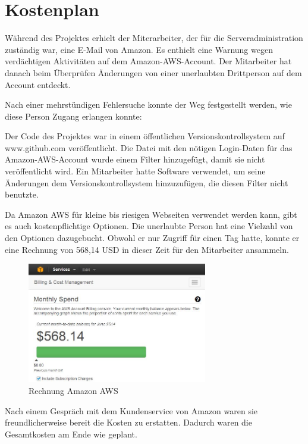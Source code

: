 \documentclass{article}
\begin{document}
\section{Kostenplan}

Während des Projektes erhielt der Miterarbeiter, der für die Serveradministration zuständig war, eine E-Mail von Amazon. Es enthielt eine Warnung wegen verdächtigen Aktivitäten auf dem Amazon-AWS-Account. Der Mitarbeiter hat danach beim Überprüfen Änderungen von einer unerlaubten Drittperson auf dem Account entdeckt.

Nach einer mehrstündigen Fehlersuche konnte der Weg festgestellt werden, wie diese Person Zugang erlangen konnte: 

Der Code des Projektes war in einem öffentlichen Versionskontrollsystem auf www.github.com veröffentlicht. Die Datei mit den nötigen Login-Daten für das Amazon-AWS-Account wurde einem Filter hinzugefügt, damit sie nicht veröffentlicht wird. Ein Mitarbeiter hatte Software verwendet, um seine Änderungen dem Versionskontrollsystem hinzuzufügen, die diesen Filter nicht benutzte.

Da Amazon AWS für kleine bis riesigen Webseiten verwendet werden kann, gibt es auch kostenpflichtige Optionen. Die unerlaubte Person hat eine Vielzahl von den Optionen dazugebucht. Obwohl er nur Zugriff für einen Tag hatte, konnte er eine Rechnung von 568,14 USD in dieser Zeit für den Mitarbeiter ansammeln.

\begin{figure}[H]
    \centering
    \includegraphics[width=0.7\textwidth]{images/amazon-bill.jpg}
    \caption{Rechnung Amazon AWS}
    \label{fig:bill}
\end{figure}

Nach einem Gespräch mit dem Kundenservice von Amazon waren sie freundlicherweise bereit die Kosten zu erstatten. Dadurch waren die Gesamtkosten am Ende wie geplant.
\end{document}
